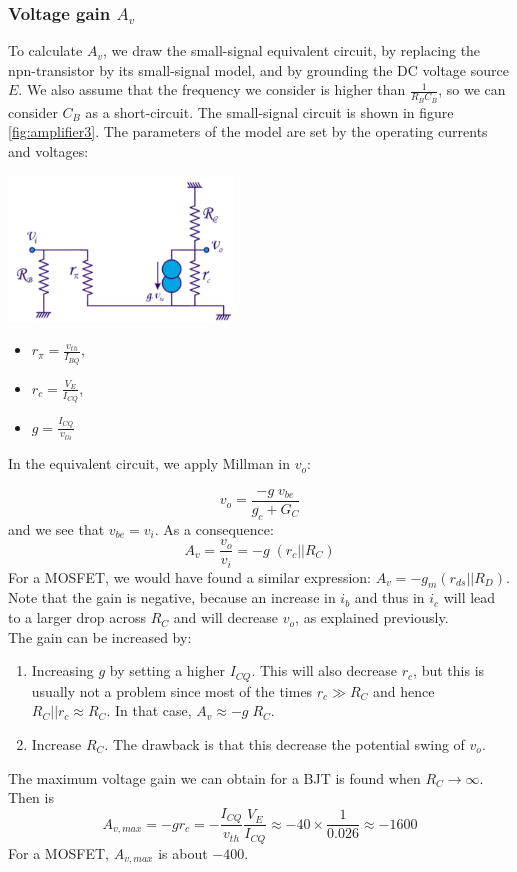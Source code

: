 \subsubsection{Voltage gain $A_v$}

\begin{minipage}{.5\textwidth}
	To calculate $A_v$, we draw the small-signal equivalent circuit, by replacing the npn-transistor by its small-signal model, and by grounding the DC voltage source $E$. We also assume that the frequency we consider is higher than $\frac{1}{R_B C_B}$, so we can consider $C_B$ as a short-circuit. The small-signal circuit is shown in figure \ref{fig:amplifier3}. The parameters of the model are set by the operating currents and voltages:
\end{minipage}%
\begin{minipage}{.5\textwidth}
	\centering
	\includegraphics[width=6cm]{figures/ch02/amplifier3.jpg}
	\label{fig:amplifier3}
\end{minipage}

\begin{itemize}
	\item $r_{\pi} = \frac{v_{th}}{I_{BQ}}$,
	\item $r_c = \frac{V_E}{I_{CQ}}$,
	\item $g = \frac{I_{CQ}}{v_{th}}$
\end{itemize}
In the equivalent circuit, we apply Millman in $v_o$:

$$v_o = \frac{-g \; v_{be}}{g_c +G_C}$$
and we see that $v_{be} = v_i$. As a consequence: 
\begin{equation}
	A_v = \frac{v_o}{v_i} = - g \; (r_c || R_C)
\end{equation}
For a MOSFET, we would have found a similar expression: $A_v = - g_m (r_{ds} || R_D)$. Note that the gain is negative, because an increase in $i_b$ and thus in $i_c$ will lead to a larger drop across $R_C$ and will decrease $v_o$, as explained previously.\\
The gain can be increased by:
\begin{enumerate}
	\item Increasing $g$ by setting a higher $I_{CQ}$. This will also decrease $r_c$, but this is usually not a problem since most of the times $r_c \gg R_C$ and hence $R_C || r_c \approx R_C$. In that case, $A_v \approx -g\;R_C$.
	\item Increase $R_C$. The drawback is that this decrease the potential swing of $v_o$.
\end{enumerate}
The maximum voltage gain we can obtain for a BJT is found when $R_C \rightarrow \infty$. Then is
$$A_{v,max} = -gr_c = - \frac{I_{CQ}}{v_{th}} \frac{V_E}{I_{CQ}} \approx -40 \times \frac{1}{0.026} \approx -1600$$
For a MOSFET, $A_{v,max}$ is about $-400$.
